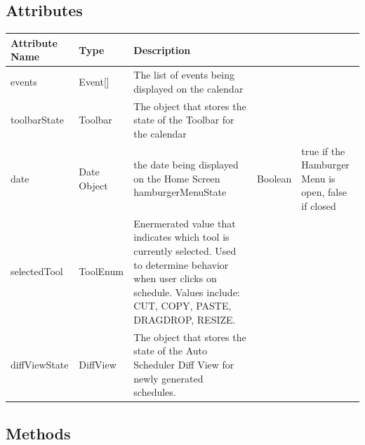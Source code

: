 \documentclass{scrreprt}
\begin{document}
\subsection{Attributes}

\begin{center}
\begin{longtable}{ | p{5cm} | p{5cm} | p{5cm} | }
\hline
\textbf{Attribute Name} & \textbf{Type} & \textbf{Description} \\
\hline
events & Event[] & The list of events being displayed on the calendar \\
\hline
toolbarState & Toolbar & The object that stores the state of the Toolbar for the calendar \\
\hline
date & Date Object & the date being displayed on the Home Screen
\hline
hamburgerMenuState & Boolean & true if the Hamburger Menu is open, false if closed \\
\hline
selectedTool & ToolEnum & Enermerated value that indicates which tool is currently selected. Used to determine behavior when user clicks on schedule. Values include: CUT, COPY, PASTE, DRAGDROP,
RESIZE.\\
\hline
diffViewState & DiffView & The object that stores the state of the Auto Scheduler Diff View for newly generated schedules.\\
\hline
\end{longtable}
\end{center}

\subsection{Methods}
\end{document}

